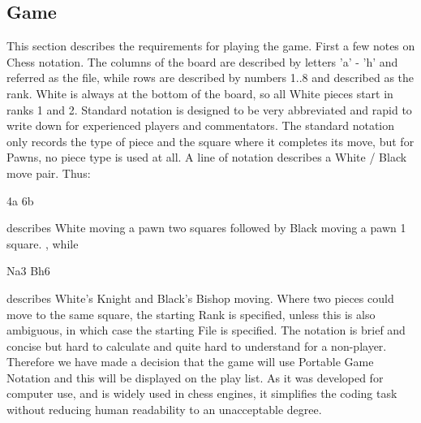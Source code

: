 \documentclass[a4paper,10pt]{article}
\begin{document}
\subsection{Game}

This section describes the requirements for playing the game. First a few notes on Chess notation. 
The columns of the board are described by letters 'a' - 'h' and referred as the file, while rows are described by numbers 1..8 and described as the rank. White is always at the bottom of the board, so all White pieces start in ranks 1 and 2. 
Standard notation is designed to be very abbreviated and rapid to write down for experienced players and commentators. The standard notation only records the type of piece and the square where it completes its move, but for Pawns, no piece type is used at all. A line of notation describes a White / Black move pair. Thus:
\par
4a 6b
\par
describes White moving a pawn two squares followed by Black moving a pawn 1 square. , while 
\par
Na3 Bh6
\par
describes White's Knight and Black's Bishop moving. Where two pieces could move to the same square, the starting Rank is specified, unless this is also ambiguous, in which case the starting File is specified. The notation is brief and concise but hard to calculate and quite hard to understand for a non-player. Therefore we have made a decision that the game will use Portable Game Notation \cite{PGN-94} \cite{PGN-Wiki} and this will be displayed on the play list. As it was developed for computer use, and is widely used in chess engines, it simplifies the coding task without reducing human readability to an unacceptable degree. 
\end{document}
